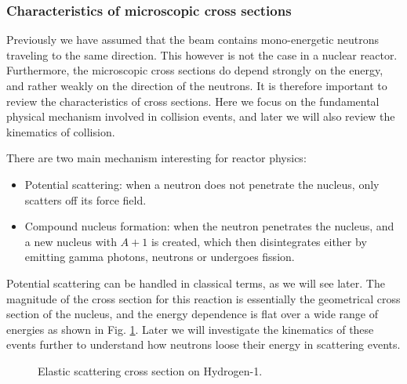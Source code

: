 \subsubsection{Characteristics of microscopic cross sections}

Previously we have assumed that the beam contains mono-energetic neutrons traveling to the same direction. This however is not the case in a nuclear reactor. Furthermore, the microscopic cross sections do depend strongly on the energy, and rather weakly on the direction of the neutrons. It is therefore important to review the characteristics of cross sections. Here we focus on the fundamental physical mechanism involved in collision events, and later we will also review the kinematics of collision.

There are two main mechanism interesting for reactor physics:

\begin{itemize}
\item Potential scattering: when a neutron does not penetrate the nucleus, only scatters off its force field.
\item Compound nucleus formation: when the neutron penetrates the nucleus, and a new nucleus with $A+1$ is created, which then disintegrates either by emitting gamma photons, neutrons or undergoes fission.
\end{itemize}

Potential scattering can be handled in classical terms, as we will see later. The magnitude of the cross section for this reaction is essentially the geometrical cross section of the nucleus, and the energy dependence is flat over a wide range of energies as shown in Fig. \ref{fig:h1scatter}. Later we will investigate the kinematics of these events further to understand how neutrons loose their energy in scattering events.

\begin{figure}[ht!]
\protect {}\protect
\caption{\label{fig:h1scatter} \footnotesize{Elastic scattering cross section on Hydrogen-1.}}
\end{figure}

